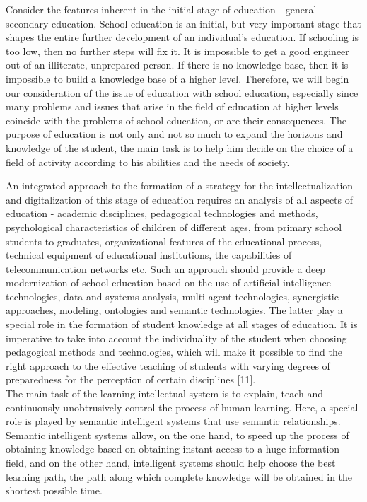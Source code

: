 \documentclass[a4paper, 10pt,twocolumn]{article}
\begin{document}
Consider the features inherent in the initial stage of
education - general secondary education. School education is an initial, but very important stage that shapes the
entire further development of an individual’s education.
If schooling is too low, then no further steps will fix it. It
is impossible to get a good engineer out of an illiterate,
unprepared person. If there is no knowledge base, then it
is impossible to build a knowledge base of a higher level.
Therefore, we will begin our consideration of the issue of
education with school education, especially since many
problems and issues that arise in the field of education
at higher levels coincide with the problems of school
education, or are their consequences. The purpose of
education is not only and not so much to expand the
horizons and knowledge of the student, the main task is
to help him decide on the choice of a field of activity
according to his abilities and the needs of society.

An integrated approach to the formation of a strategy
for the intellectualization and digitalization of this stage
of education requires an analysis of all aspects of education - academic disciplines, pedagogical technologies
and methods, psychological characteristics of children of
different ages, from primary school students to graduates,
organizational features of the educational process, technical equipment of educational institutions, the capabilities
of telecommunication networks etc. Such an approach
should provide a deep modernization of school education
based on the use of artificial intelligence technologies,
data and systems analysis, multi-agent technologies, synergistic approaches, modeling, ontologies and semantic
technologies. The latter play a special role in the formation of student knowledge at all stages of education.
It is imperative to take into account the individuality
of the student when choosing pedagogical methods and
technologies, which will make it possible to find the
right approach to the effective teaching of students with
varying degrees of preparedness for the perception of
certain disciplines [11].
\\

The main task of the learning intellectual system is
to explain, teach and continuously unobtrusively control
the process of human learning. Here, a special role is
played by semantic intelligent systems that use semantic
relationships. Semantic intelligent systems allow, on the
one hand, to speed up the process of obtaining knowledge
based on obtaining instant access to a huge information
field, and on the other hand, intelligent systems should
help choose the best learning path, the path along which
complete knowledge will be obtained in the shortest
possible time.
\\
\end{document}
